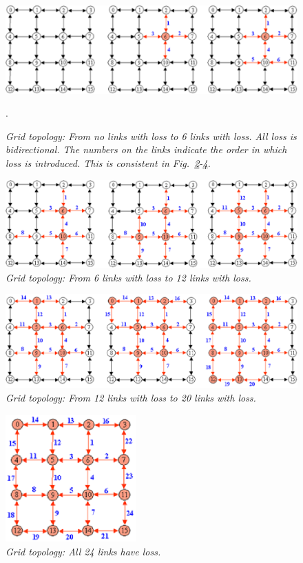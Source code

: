 \begin{figure}
\centerline{%
\includegraphics[width=14cm,angle=0]{figures/lossGraph1-6.eps}
}
\caption{{\it Grid topology: From no links with loss to 6 links with loss. All loss is bidirectional. The numbers on the links indicate the order in which loss is introduced. This is consistent in Fig.~\ref{fig:graph6-12}-\ref{fig:graph24}.}}.
\label{fig:graph1-6}
\end{figure}

\begin{figure}
\centerline{%
\includegraphics[width=14cm,angle=0]{figures/lossGraph6-12.eps}
}
\caption{ {\it Grid topology: From 6 links with loss to 12 links with loss.}}
\label{fig:graph6-12}
\end{figure}


\begin{figure}
\centerline{%
\includegraphics[width=14cm,angle=0]{figures/lossGraph12-20.eps}
}
\caption{ {\it Grid topology: From 12 links with loss to 20 links with loss.}}
\label{fig:graph12-20}
\end{figure}


\begin{figure}
\centerline{%
\includegraphics[width=5cm,angle=0]{figures/lossGraph24.eps}
}
\caption{{\it Grid topology: All 24 links have loss.}}
\label{fig:graph24}
\end{figure}

